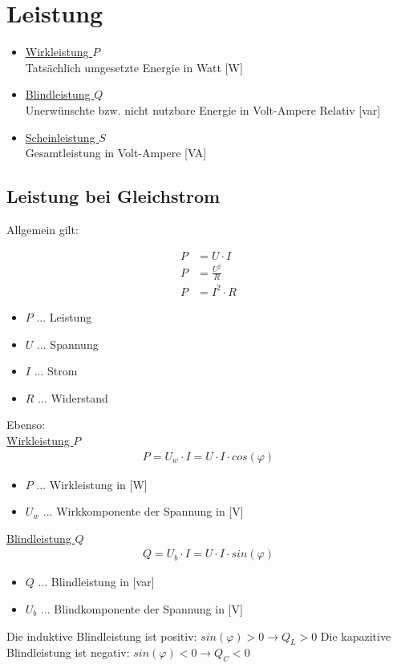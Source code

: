 \chapter{Leistung}
\begin{itemize}
    \item \underline{Wirkleistung $P$} \\
    Tatsächlich umgesetzte Energie in Watt [W]
    \item \underline{Blindleistung $Q$} \\
    Unerwünschte bzw. nicht nutzbare Energie in Volt-Ampere Relativ [var]
    \item \underline{Scheinleistung $S$} \\
    Gesamtleistung in Volt-Ampere [VA]
\end{itemize}

\section{Leistung bei Gleichstrom}
Allgemein gilt:

\begin{align}
    P&=U\cdot I \\
    P&=\frac{U^2}{R} \\
    P&=I^2\cdot R    
\end{align}

\begin{itemize}
    \item $P$ ... Leistung
    \item $U$ ... Spannung
    \item $I$ ... Strom
    \item $R$ ... Widerstand
\end{itemize}

\newpage

Ebenso: \\
\underline{Wirkleistung $P$}
\begin{align}
    P = U_w \cdot I = U \cdot I \cdot cos(\varphi)
\end{align}
\begin{itemize}
    \item $P$ ... Wirkleistung in [W]
    \item $U_w$ ... Wirkkomponente der Spannung in [V]
\end{itemize}

\underline{Blindleistung $Q$}
\begin{align}
    Q = U_b \cdot I = U \cdot I \cdot sin(\varphi)
\end{align}
\begin{itemize}
    \item $Q$ ... Blindleistung in [var]
    \item $U_b$ ... Blindkomponente der Spannung in [V]
\end{itemize}
Die induktive Blindleistung ist positiv: $sin(\varphi) > 0 \rightarrow Q_L > 0$
Die kapazitive Blindleistung ist negativ: $sin(\varphi) < 0 \rightarrow Q_C < 0$

